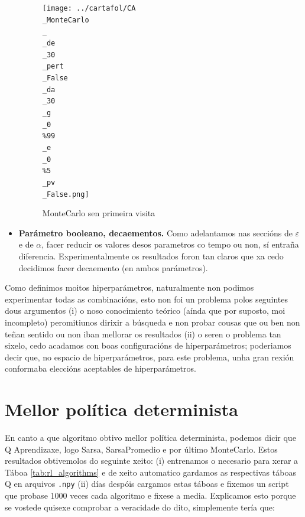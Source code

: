 \documentclass{article}
\begin{document}
\begin{itemize}
\begin{figure}[htbp]
\begin{minipage}{0.45\textwidth}
    \end{minipage}
    \hfill
    \begin{minipage}{0.45\textwidth}
        \centering
	\texttt{[image: ../cartafol/CA\\\_MonteCarlo\\\_\\\_de\\\_30\\\_pert\\\_False\\\_da\\\_30\\\_g\\\_0\\\%99\\\_e\\\_0\\\%5\\\_pv\\\_False.png]}
\caption*{MonteCarlo sen primeira visita}

    \end{minipage}
\end{figure}


	\item \textbf{Parámetro booleano, decaementos.} Como adelantamos nas seccións de $\varepsilon$ e de $\alpha$, facer reducir os valores desos parametros co tempo ou non, sí entraña diferencia. Experimentalmente os resultados foron tan claros que xa cedo decidimos facer decaemento (en ambos parámetros).

\end{itemize}

Como definimos moitos hiperparámetros, naturalmente non podimos experimentar todas as combinacións, esto non foi un problema polos seguintes dous argumentos (i) o noso conocimiento teórico (aínda que por suposto, moi incompleto) peromitiunos dirixir a búsqueda e non probar cousas que ou ben non teñan sentido ou non iban mellorar os resultados (ii) o seren o problema tan sixelo, cedo acadamos con boas configuracións de hiperparámetros; poderiamos decir que, no espacio de hiperparámetros, para este problema, unha gran rexión conformaba eleccións aceptables de hiperparámetros. 

\newpage

\section{Mellor política determinista}

En canto a que algoritmo obtivo mellor política determinista, podemos dicir que Q Aprendizaxe, logo Sarsa, SarsaPromedio e por último MonteCarlo. Estos resultados obtivemolos do seguinte xeito: (i) entrenamos o necesario para xerar a Táboa \ref{tab:rl_algorithms} e de xeito automatico gardamos as respectivas táboas Q en arquivos \texttt{.npy} (ii) días despóis  cargamos estas táboas e fixemos un script que probase 1000 veces cada algoritmo e fixese a media. Explicamos esto porque se vostede quisexe comprobar a veracidade do dito, simplemente tería que: 
\end{document}
